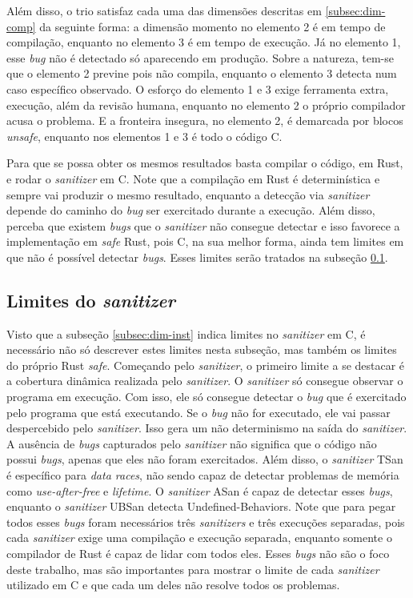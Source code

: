 Além disso, o trio satisfaz cada uma das dimensões descritas em \ref{subsec:dim-comp} da seguinte forma: a dimensão momento no elemento 2 é em tempo de compilação, enquanto no elemento 3 é em tempo de execução. Já no elemento 1, esse \textit{bug} não é detectado só aparecendo em produção. Sobre a natureza, tem-se que o elemento 2 previne pois não compila, enquanto o elemento 3 detecta num caso específico observado. O esforço do elemento 1 e 3 exige ferramenta extra, execução, além da revisão humana, enquanto no elemento 2 o próprio compilador acusa o problema. E a fronteira insegura, no elemento 2, é demarcada por blocos \textit{unsafe}, enquanto nos elementos 1 e 3 é todo o código C.

Para que se possa obter os mesmos resultados basta compilar o código, em Rust, e rodar o \textit{sanitizer} em C. Note que a compilação em Rust é determinística e sempre vai produzir o mesmo resultado, enquanto a detecção via \textit{sanitizer} depende do caminho do \textit{bug} ser exercitado durante a execução. Além disso, perceba que existem \textit{bugs} que o \textit{sanitizer} não consegue detectar e isso favorece a implementação em \textit{safe} Rust, pois C, na sua melhor forma, ainda tem limites em que não é possível detectar \textit{bugs}. Esses limites serão tratados na subseção \ref{subsec:dim-bounds}.

\subsection{Limites do \textit{sanitizer}}
\label{subsec:dim-bounds}

Visto que a subseção \ref{subsec:dim-inst} indica limites no \textit{sanitizer} em C, é necessário não só descrever estes limites nesta subseção, mas também os limites do próprio Rust \textit{safe}. Começando pelo \textit{sanitizer}, o primeiro limite a se destacar é a cobertura dinâmica realizada pelo \textit{sanitizer}. O \textit{sanitizer} só consegue observar o programa em execução. Com isso, ele só consegue detectar o \textit{bug} que é exercitado pelo programa que está executando. Se o \textit{bug} não for executado, ele vai passar despercebido pelo \textit{sanitizer}. Isso gera um não determinismo na saída do \textit{sanitizer}. A ausência de \textit{bugs} capturados pelo \textit{sanitizer} não significa que o código não possui \textit{bugs}, apenas que eles não foram exercitados. Além disso, o \textit{sanitizer} \ac{TSan} é específico para \textit{data races}, não sendo capaz de detectar problemas de memória como \textit{use-after-free} e \textit{lifetime}. O \textit{sanitizer} \ac{ASan} é capaz de detectar esses \textit{bugs}, enquanto o \textit{sanitizer} \ac{UBSan} detecta Undefined-Behaviors. Note que para pegar todos esses \textit{bugs} foram necessários três \textit{sanitizers} e três execuções separadas, pois cada \textit{sanitizer} exige uma compilação e execução separada, enquanto somente o compilador de Rust é capaz de lidar com todos eles. Esses \textit{bugs} não são o foco deste trabalho, mas são importantes para mostrar o limite de cada \textit{sanitizer} utilizado em C e que cada um deles não resolve todos os problemas.

